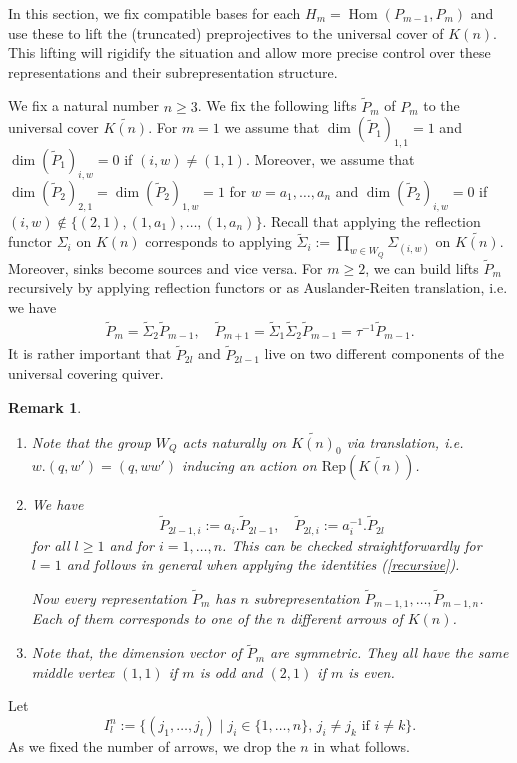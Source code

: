 \documentclass{amsart}
\newtheorem{remark}[theorem]{Remark}
\newcommand{\Rep}{\mathrm{Rep}}
\newcommand{\Hom}{\operatorname{Hom}}
\begin{document}
In this section, we fix compatible bases for each $H_m=\Hom(P_{m-1},P_m)$ and use these to lift the (truncated) preprojectives to the universal cover of $K(n)$.
This lifting will rigidify the situation and allow more precise control over these representations and their subrepresentation structure.

We fix a natural number $n\geq 3$. We fix the following lifts $\tilde P_m$  of $P_m$ to the universal cover $\widetilde{K(n)}$. For $m=1$ we assume that $\dim (\tilde P_1)_{1,1}=1$ and $\dim (\tilde P_1)_{i,w}=0$ if $(i,w)\neq (1,1)$. Moreover, we assume that $\dim (\tilde P_2)_{2,1}=\dim (\tilde P_2)_{1,w}=1$ for $w=a_1,\ldots,a_n$ and $\dim (\tilde P_2)_{i,w}=0$ if $(i,w)\notin\{(2,1),(1,a_1),\ldots,(1,a_n)\}$. Recall that applying the reflection functor $\Sigma_i$ on $K(n)$ corresponds to applying $\tilde\Sigma_i:=\prod_{w\in W_Q}\Sigma_{(i,w)}$ on $\widetilde{K(n)}$. Moreover, sinks become sources and vice versa. For $m\geq 2$, we can build lifts $\tilde P_m$ recursively by applying reflection functors or as Auslander-Reiten translation, i.e. we have
\begin{align}
  \label{recursive}
  \tilde P_m=\tilde\Sigma_2 \tilde P_{m-1},\quad\tilde P_{m+1}=\tilde\Sigma_{1}\tilde\Sigma_2\tilde P_{m-1}=\tau^{-1} \tilde P_{m-1}.
\end{align}
It is rather important that $\tilde P_{2l}$ and $\tilde P_{2l-1}$ live on two different components of the universal covering quiver.
 

\begin{remark}
  \begin{enumerate}
    \item Note that the group $W_Q$ acts naturally on $\widetilde{K(n)}_0$ via translation, i.e. $w.(q,w')=(q,ww')$ inducing an action on $\Rep(\widetilde{K(n)})$. 
    \item We have 
      $$\tilde P_{2l-1,i}:=a_i.\tilde P_{2l-1},\quad \tilde P_{2l,i}:=a_i^{-1}.\tilde P_{2l}$$
      for all $l\geq 1$ and for $i=1,\ldots,n$. This can be checked straightforwardly for $l=1$ and follows in general when applying the identities (\ref{recursive}). 

      Now every representation $\tilde P_m$ has $n$ subrepresentation $\tilde P_{m-1,1},\ldots,\tilde P_{m-1,n}$. Each of them corresponds to one of the $n$ different arrows of $K(n)$. 
    \item Note that, the dimension vector of $\tilde P_m$ are symmetric. They all have the same middle vertex $(1,1)$ if $m$ is odd and $(2,1)$ if $m$ is even.
\end{enumerate}
\end{remark}
Let
$$I^n_l:=\{(j_1,\ldots,j_{l})\mid j_i\in\{1,\ldots,n\},\,j_i\neq j_k\text{ if }i\neq k\}.$$
As we fixed the number of arrows, we drop the $n$ in what follows. 
\end{document}
